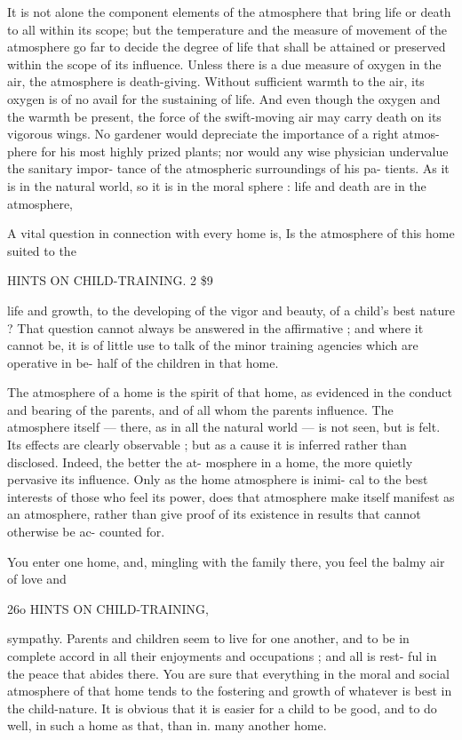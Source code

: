 \documentclass[
]{book}
\begin{document}
It is not alone the component elements of the atmosphere that bring life or death to all within its scope; but the temperature and the measure of movement of the atmosphere go far to decide the degree of life that shall be attained or preserved within the scope of its influence. Unless there is a due measure of oxygen in the air, the atmosphere is death-giving. Without sufficient warmth to the air, its oxygen is of no avail for the sustaining of life. And even though the oxygen and the warmth be present, the force of the swift-moving air may carry death on its vigorous wings. No gardener would depreciate the importance of a right atmos- phere for his most highly prized plants; nor would any wise physician undervalue the sanitary impor- tance of the atmospheric surroundings of his pa- tients. As it is in the natural world, so it is in the moral sphere : life and death are in the atmosphere,

A vital question in connection with every home is, Is the atmosphere of this home suited to the

HINTS ON CHILD-TRAINING. 2 \$9

life and growth, to the developing of the vigor and beauty, of a child's best nature ? That question cannot always be answered in the affirmative ; and where it cannot be, it is of little use to talk of the minor training agencies which are operative in be- half of the children in that home.

The atmosphere of a home is the spirit of that home, as evidenced in the conduct and bearing of the parents, and of all whom the parents influence. The atmosphere itself --- there, as in all the natural world --- is not seen, but is felt. Its effects are clearly observable ; but as a cause it is inferred rather than disclosed. Indeed, the better the at- mosphere in a home, the more quietly pervasive its influence. Only as the home atmosphere is inimi- cal to the best interests of those who feel its power, does that atmosphere make itself manifest as an atmosphere, rather than give proof of its existence in results that cannot otherwise be ac- counted for.

You enter one home, and, mingling with the family there, you feel the balmy air of love and

26o HINTS ON CHILD-TRAINING,

sympathy. Parents and children seem to live for one another, and to be in complete accord in all their enjoyments and occupations ; and all is rest- ful in the peace that abides there. You are sure that everything in the moral and social atmosphere of that home tends to the fostering and growth of whatever is best in the child-nature. It is obvious that it is easier for a child to be good, and to do well, in such a home as that, than in. many another home.
\end{document}
